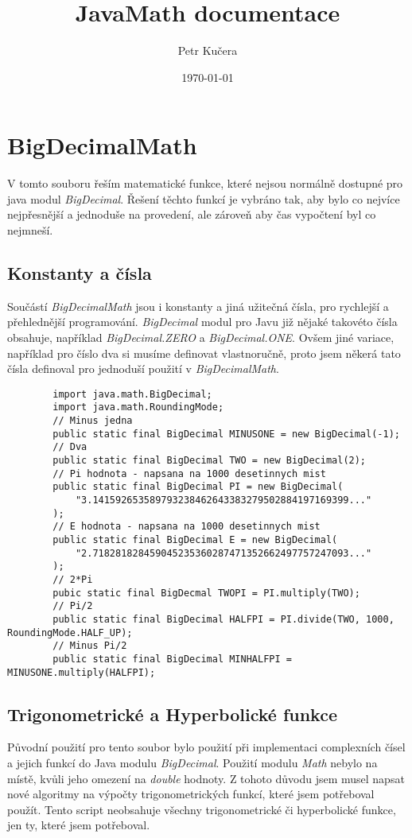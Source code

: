 \documentclass{article}
\title{\textbf{JavaMath documentace}}
\author{Petr Kučera}
\date{\today}
\begin{document}
    \section{BigDecimalMath}
    V tomto souboru řeším matematické funkce, které nejsou normálně dostupné pro
    java modul \textit{BigDecimal}. Řešení těchto funkcí je vybráno tak, aby bylo co
    nejvíce nejpřesnější a jednoduše na provedení, ale zároveň aby čas vypočtení byl co
    nejmneší.

    \subsection{Konstanty a čísla}
    Součástí \textit{BigDecimalMath} jsou i konstanty a jiná užitečná čísla, pro rychlejší
    a přehlednější programování. 
    \textit{BigDecimal} modul pro Javu již nějaké takovéto čísla obsahuje, 
    například \textit{BigDecimal.ZERO} a \textit{BigDecimal.ONE}. Ovšem jiné variace, například
    pro číslo dva si musíme definovat vlastnoručně, proto jsem někerá tato čísla definoval pro
    jednoduší použití v \textit{BigDecimalMath}. 
    \begin{lstlisting}
        import java.math.BigDecimal;
        import java.math.RoundingMode;
        // Minus jedna
        public static final BigDecimal MINUSONE = new BigDecimal(-1);
        // Dva
        public static final BigDecimal TWO = new BigDecimal(2);
        // Pi hodnota - napsana na 1000 desetinnych mist
        public static final BigDecimal PI = new BigDecimal(
            "3.141592653589793238462643383279502884197169399..."
        );
        // E hodnota - napsana na 1000 desetinnych mist
        public static final BigDecimal E = new BigDecimal(
            "2.718281828459045235360287471352662497757247093..."
        );
        // 2*Pi
        pubic static final BigDecmal TWOPI = PI.multiply(TWO);
        // Pi/2
        public static final BigDecimal HALFPI = PI.divide(TWO, 1000, RoundingMode.HALF_UP);
        // Minus Pi/2
        public static final BigDecimal MINHALFPI = MINUSONE.multiply(HALFPI);
    \end{lstlisting}
    \subsection{Trigonometrické a Hyperbolické funkce}
    Původní použití pro tento soubor bylo použití při implementaci complexních čísel a 
    jejich funkcí do Java modulu \textit{BigDecimal}. Použití modulu \textit{Math} nebylo
    na místě, kvůli jeho omezení na \textit{double} hodnoty. Z tohoto důvodu jsem musel napsat
    nové algoritmy na výpočty trigonometrických funkcí, které jsem potřeboval použít. \newline
    Tento script neobsahuje všechny trigonometrické či hyperbolické funkce, jen ty, které jsem potřeboval.
\end{document}
